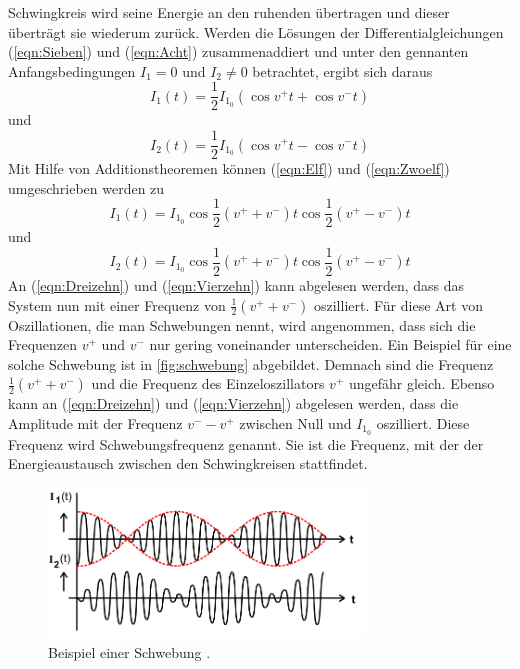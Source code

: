 Schwingkreis wird seine Energie an den ruhenden übertragen und dieser überträgt sie wiederum zurück.
\newline
Werden die Lösungen der Differentialgleichungen (\ref {eqn:Sieben}) und (\ref {eqn:Acht}) zusammenaddiert und unter den gennanten
Anfangsbedingungen $ I_1 = 0 $ und $ I_2 \neq 0 $ betrachtet, ergibt sich daraus
\begin{equation}
    I_1(t) = \frac{1}{2} I_{1_0} (\cos v^{+} t + \cos v^{-} t )
    \label{eqn:Elf}
\end{equation}
und
\begin{equation}
    I_2(t) = \frac{1}{2} I_{1_0} (\cos v^{+} t - \cos v^{-} t )
    \label{eqn:Zwoelf}
\end{equation}
Mit Hilfe von Additionstheoremen können (\ref {eqn:Elf}) und (\ref {eqn:Zwoelf}) umgeschrieben werden zu
\begin{equation}
    I_1(t) = I_{1_0} \cos \frac{1}{2} (v^{+} + v^{-}) t \cos \frac{1}{2} (v^{+} - v^{-}) t
    \label{eqn:Dreizehn}
\end{equation}
und
\begin{equation}
    I_2(t) = I_{1_0} \cos \frac{1}{2} (v^{+} + v^{-}) t \cos \frac{1}{2} (v^{+} - v^{-}) t
    \label{eqn:Vierzehn}
\end{equation}
\newline
An (\ref {eqn:Dreizehn}) und (\ref {eqn:Vierzehn}) kann abgelesen werden, dass das System nun mit einer Frequenz von $ \frac{1}{2} (v^{+} + v^{-}) $ oszilliert.
Für diese Art von Oszillationen, die man Schwebungen nennt, wird angenommen, dass sich die Frequenzen $ v^{+} $ und $ v^{-} $ nur gering voneinander unterscheiden.
Ein Beispiel für eine solche Schwebung ist in \autoref{fig:schwebung} abgebildet.
Demnach sind die Frequenz $ \frac{1}{2} (v^{+} + v^{-}) $ und die Frequenz des Einzeloszillators $ v^{+} $ ungefähr gleich.
\newline
Ebenso kann an (\ref {eqn:Dreizehn}) und (\ref {eqn:Vierzehn}) abgelesen werden, dass die Amplitude mit der Frequenz $ v^{-} - v^{+} $ zwischen Null und $ I_{1_0} $ oszilliert.
Diese Frequenz wird Schwebungsfrequenz genannt. Sie ist die Frequenz, mit der der Energieaustausch zwischen den Schwingkreisen stattfindet.

\begin{figure}[H]
    \centering
    \includegraphics[width=0.75\textwidth]{plots/Schwebung.png}
    \caption{Beispiel einer Schwebung \cite{Versuchsanleitung}.}
    \label{fig:schwebung}
\end{figure}

